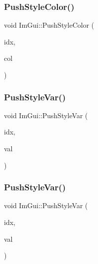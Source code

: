 \subsubsection{\texorpdfstring{Push\+Style\+Color()}{PushStyleColor()}\hspace{0.1cm}{\footnotesize\ttfamily [2/2]}}
{\footnotesize\ttfamily void Im\+Gui\+::\+Push\+Style\+Color (\begin{DoxyParamCaption}\item[{Im\+Gui\+Col}]{idx,  }\item[{const \hyperlink{struct_im_vec4}{Im\+Vec4} \&}]{col }\end{DoxyParamCaption})}

\hypertarget{namespace_im_gui_aab3f43009094462cf2a5eb554785949b}{}\label{namespace_im_gui_aab3f43009094462cf2a5eb554785949b} 
\subsubsection{\texorpdfstring{Push\+Style\+Var()}{PushStyleVar()}\hspace{0.1cm}{\footnotesize\ttfamily [1/2]}}
{\footnotesize\ttfamily void Im\+Gui\+::\+Push\+Style\+Var (\begin{DoxyParamCaption}\item[{Im\+Gui\+Style\+Var}]{idx,  }\item[{float}]{val }\end{DoxyParamCaption})}

\hypertarget{namespace_im_gui_ae404b6978e9aedec5c16627d8c45f923}{}\label{namespace_im_gui_ae404b6978e9aedec5c16627d8c45f923} 
\subsubsection{\texorpdfstring{Push\+Style\+Var()}{PushStyleVar()}\hspace{0.1cm}{\footnotesize\ttfamily [2/2]}}
{\footnotesize\ttfamily void Im\+Gui\+::\+Push\+Style\+Var (\begin{DoxyParamCaption}\item[{Im\+Gui\+Style\+Var}]{idx,  }\item[{const \hyperlink{struct_im_vec2}{Im\+Vec2} \&}]{val }\end{DoxyParamCaption})}

